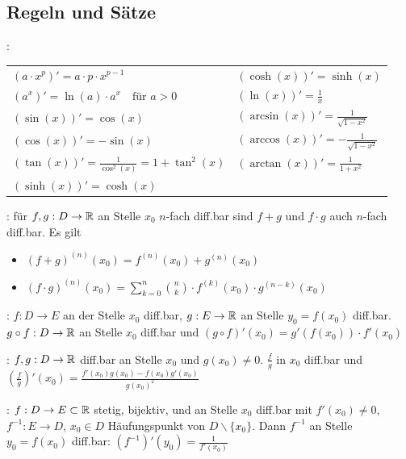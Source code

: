 \subsection{Regeln und Sätze}

\begin{minipage}{\linewidth}
\Satz {}:

\begin{tabular}{ll}
    $(a \cdot x^p)' = a \cdot p \cdot x^{p-1}$          & $(\cosh(x))' = \sinh(x)$ \\
    $(a^x)' = \ln(a) \cdot a^x \quad \text{für } a > 0$ & $(\ln(x))' = \frac{1}{x}$ \\
    $(\sin(x))' = \cos(x)$                              & $(\arcsin(x))' = \frac{1}{\sqrt{1 - x^2}}$\\
    $(\cos(x))' = -\sin(x)$                             & $(\arccos(x))' = -\frac{1}{\sqrt{1 - x^2}}$ \\
    $(\tan(x))' = \frac{1}{\cos^2(x)} = 1 + \tan^2(x)$  & $(\arctan(x))' = \frac{1}{1 + x^2}$ \\
    $(\sinh(x))' = \cosh(x)$
\end{tabular}
\end{minipage}

\Satz {}: für $f,g: D \to \mathbb{R}$ an Stelle $x_0$ $n$-fach diff.bar sind
$f+g$ und $f\cdot g$ auch $n$-fach diff.bar. Es gilt
\vspace{-0.6em}
\begin{itemize}
    \item $(f+g)^{(n)}(x_0) = f^{(n)}(x_0) + g^{(n)}(x_0)$
    \item $(f\cdot g)^{(n)}(x_0) = \sum_{k=0}^{n} \binom{n}{k} \cdot f^{(k)}(x_0) \cdot g^{(n-k)}(x_0)$
\end{itemize}

\Satz {}: $f: D \to E$ an der Stelle $x_0$ diff.bar, $g: E \to \mathbb{R}$
an Stelle $y_0 = f(x_0)$ diff.bar. $g \circ f: D \to \mathbb{R}$ an Stelle $x_0$ diff.bar und
$(g \circ f)'(x_0) = g'(f(x_0)) \cdot f'(x_0)$

\Satz {}: $f,g: D \to \mathbb{R}$ diff.bar an Stelle $x_0$ und $g(x_0) \ne 0$.
$\frac{f}{g}$ in $x_0$ diff.bar und $\left(\frac{f}{g}\right)'(x_0) = \frac{f'(x_0)g(x_0) - f(x_0)g'(x_0)}{g(x_0)^2}$

\Satz {}: $f: D \to E \subset \mathbb{R}$ stetig, bijektiv,  und an Stelle $x_0$ diff.bar mit $f'(x_0) \ne 0$,
$f^{-1}: E \to D$, $x_0 \in D$ Häufungspunkt von $D \backslash \{x_0\}$.
Dann $f^{-1}$ an Stelle $y_0 = f(x_0)$ diff.bar: $\left(f^{-1}\right)'(y_0) = \frac{1}{f'(x_0)}$

